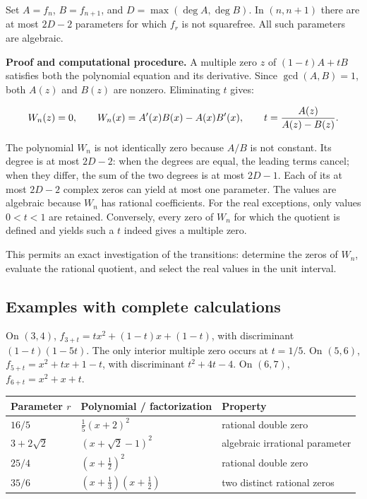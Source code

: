 \documentclass[11pt,a4paper]{article}
\newcommand{\fitmath}[1]{\begingroup\setbox0=\hbox{$\displaystyle #1$}\ifdim\wd0>\linewidth\resizebox{\linewidth}{!}{\box0}\else\box0\fi\endgroup}
\begin{document}
Set $A=f_n$, $B=f_{n+1}$, and $D=\max(\deg A,\deg B)$. In $(n,n+1)$ there are at most $2D-2$ parameters for which $f_r$ is not squarefree. All such parameters are algebraic.


\textbf{Proof and computational procedure.} A multiple zero $z$ of $(1-t)A+tB$ satisfies both the polynomial equation and its derivative. Since $\gcd(A,B)=1$, both $A(z)$ and $B(z)$ are nonzero. Eliminating $t$ gives:


\[
\fitmath{W_n(z)=0,\qquad W_n(x)=A'(x)B(x)-A(x)B'(x),\qquad t=\frac{A(z)}{A(z)-B(z)}.}
\]


The polynomial $W_n$ is not identically zero because $A/B$ is not constant. Its degree is at most $2D-2$: when the degrees are equal, the leading terms cancel; when they differ, the sum of the two degrees is at most $2D-1$. Each of its at most $2D-2$ complex zeros can yield at most one parameter. The values are algebraic because $W_n$ has rational coefficients. For the real exceptions, only values $0<t<1$ are retained. Conversely, every zero of $W_n$ for which the quotient is defined and yields such a $t$ indeed gives a multiple zero.


This permits an exact investigation of the transitions: determine the zeros of $W_n$, evaluate the rational quotient, and select the real values in the unit interval.


\subsection*{Examples with complete calculations}

On $(3,4)$, $f_{3+t}=t x^2+(1-t)x+(1-t)$, with discriminant $(1-t)(1-5t)$. The only interior multiple zero occurs at $t=1/5$. On $(5,6)$, $f_{5+t}=x^2+tx+1-t$, with discriminant $t^2+4t-4$. On $(6,7)$, $f_{6+t}=x^2+x+t$.


\begin{center}

\renewcommand{\arraystretch}{1.35}

\begin{tabular}{p{}p{}p{}}

\hline

Parameter $r$ & Polynomial / factorization & Property \\

\hline

$16/5$ & $\frac15(x+2)^2$ & rational double zero \\

$3+2\sqrt2$ & $(x+\sqrt2-1)^2$ & algebraic irrational parameter \\

$25/4$ & $(x+\frac12)^2$ & rational double zero \\

$35/6$ & $(x+\frac13)(x+\frac12)$ & two distinct rational zeros \\

\hline

\end{tabular}

\end{center}
\end{document}

